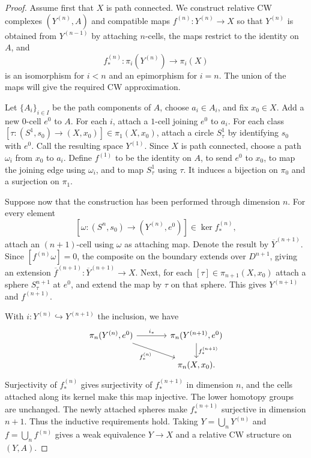\begin{proof}
Assume first that $X$ is path connected. We construct relative CW complexes
$(Y^{(n)},A)$ and compatible maps $f^{(n)}:Y^{(n)}\to X$ so that
$Y^{(n)}$ is obtained from $Y^{(n-1)}$ by attaching $n$-cells, the maps restrict
to the identity on $A$, and
\[
 f^{(n)}_*:\pi_i(Y^{(n)})\longrightarrow\pi_i(X)
\]
is an isomorphism for $i<n$ and an epimorphism for $i=n$.
The union of the maps will give the required CW approximation.

Let $\{A_i\}_{i\in I}$ be the path components of $A$, choose $a_i\in A_i$,
and fix $x_0\in X$. Add a new $0$-cell $e^0$ to $A$. For each $i$, attach a
$1$-cell joining $e^0$ to $a_i$. For each class
$[\tau:(S^1,s_0)\to(X,x_0)]\in\pi_1(X,x_0)$, attach a circle $S^1_\tau$
by identifying $s_0$ with $e^0$. Call the resulting space $Y^{(1)}$.
Since $X$ is path connected, choose a path $\omega_i$ from $x_0$ to $a_i$.
Define $f^{(1)}$ to be the identity on $A$, to send $e^0$ to $x_0$, to map
the joining edge using $\omega_i$, and to map $S^1_\tau$ using $\tau$.
It induces a bijection on $\pi_0$ and a surjection on $\pi_1$.

Suppose now that the construction has been performed through dimension $n$.
For every element
\[
 [\omega:(S^n,s_0)\to(Y^{(n)},e^0)]\in\ker f^{(n)}_*,
\]
attach an $(n+1)$-cell using $\omega$ as attaching map. Denote the result by
$\overline Y^{(n+1)}$. Since $[f^{(n)}\omega]=0$, the composite on the
boundary extends over $D^{n+1}$, giving an extension
$\overline f^{(n+1)}:\overline Y^{(n+1)}\to X$.
Next, for each $[\tau]\in\pi_{n+1}(X,x_0)$ attach a sphere
$S^{n+1}_\tau$ at $e^0$, and extend the map by $\tau$ on that sphere.
This gives $Y^{(n+1)}$ and $f^{(n+1)}$.

With $i:Y^{(n)}\hookrightarrow Y^{(n+1)}$ the inclusion, we have
\[
\begin{tikzcd}[column sep=large]
\pi_n(Y^{(n)},e^0) \arrow[r,"i_*"] \arrow[dr,"f^{(n)}_*"'] &
\pi_n(Y^{(n+1)},e^0) \arrow[d,"f^{(n+1)}_*"]\\
&\pi_n(X,x_0).
\end{tikzcd}
\]
Surjectivity of $f^{(n)}_*$ gives surjectivity of $f^{(n+1)}_*$ in dimension
$n$, and the cells attached along its kernel make this map injective.
The lower homotopy groups are unchanged. The newly attached spheres make
$f^{(n+1)}_*$ surjective in dimension $n+1$. Thus the inductive requirements
hold. Taking $Y=\bigcup_nY^{(n)}$ and $f=\bigcup_nf^{(n)}$ gives a weak
equivalence $Y\to X$ and a relative CW structure on $(Y,A)$.


\end{proof}
